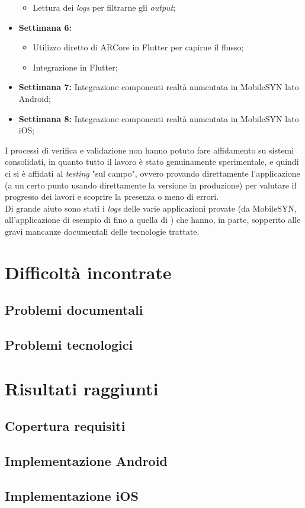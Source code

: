 \begin{itemize}
\begin{itemize}
          \item Lettura dei \textit{logs} per filtrarne gli \textit{output};
      \end{itemize}
  \item \textbf{Settimana 6:} 
      \begin{itemize}
        \item Utilizzo diretto di ARCore in Flutter per capirne il flusso;
        \item Integrazione \asa{} in Flutter;
      \end{itemize}
  \item \textbf{Settimana 7:} Integrazione componenti realtà aumentata in MobileSYN lato Android;
  \item \textbf{Settimana 8:} Integrazione componenti realtà aumentata in MobileSYN lato iOS;
\end{itemize}

I processi di verifica e validazione non hanno potuto fare affidamento su sistemi consolidati, in quanto tutto il lavoro è stato genuinamente sperimentale, e quindi ci si è affidati al \textit{testing} "sul campo", ovvero provando direttamente l'applicazione (a un certo punto usando direttamente la versione in produzione) per valutare il progresso dei lavori e scoprire la presenza o meno di errori.\\
Di grande aiuto sono stati i \textit{logs} delle varie applicazioni provate (da MobileSYN, all'applicazione di esempio di \aplug{} fino a quella di \asa{}) che hanno, in parte, sopperito alle gravi mancanze documentali delle tecnologie trattate.


\section{Difficoltà incontrate}
\label{sec:difficolta_incontrate}
\subsection{Problemi documentali}
\subsection{Problemi tecnologici}


\section{Risultati raggiunti}
\subsection{Copertura requisiti}
\subsection{Implementazione Android}
\subsection{Implementazione iOS}
